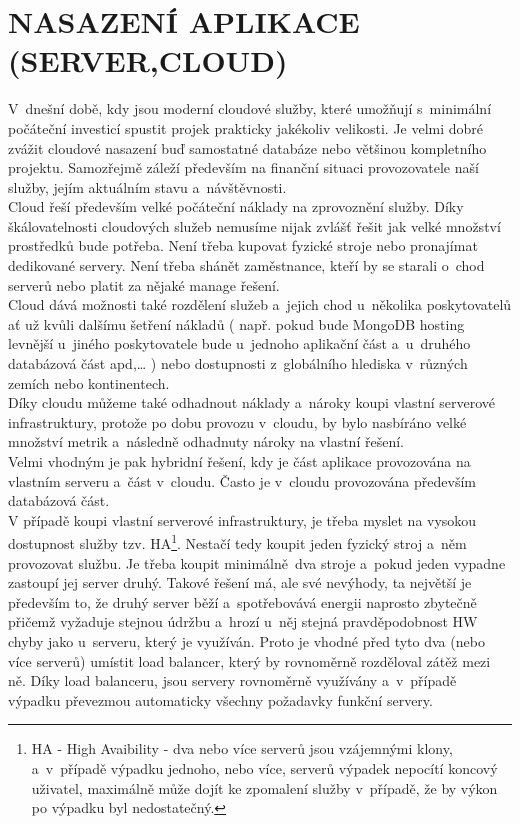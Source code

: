 \documentclass[a4paper,12pt,twoside,BCOR=10mm]{article}
\newcommand{\upc}[1]{\uppercase{#1}} %
\begin{document}
\section{\upc{Nasazení aplikace (server,cloud)}}
V~dnešní době, kdy jsou moderní cloudové služby, které umožňují s~minimální počáteční investicí spustit projek prakticky jakékoliv velikosti. Je velmi dobré zvážit cloudové nasazení buď samostatné databáze nebo většinou kompletního projektu. Samozřejmě záleží především na finanční situaci provozovatele naší služby, jejím aktuálním stavu a~návštěvnosti.\\
Cloud řeší především velké počáteční náklady na zprovoznění služby. Díky škálovatelnosti cloudových služeb nemusíme nijak zvlášť řešit jak velké množství prostředků bude potřeba. Není třeba kupovat fyzické stroje nebo pronajímat dedikované servery. Není třeba shánět zaměstnance, kteří by se starali o~chod serverů nebo platit za nějaké manage řešení.\\
Cloud dává možnosti také rozdělení služeb a~jejich chod u~několika poskytovatelů ať už kvůli dalšímu šetření nákladů ( např. pokud bude MongoDB hosting levnější u~jiného poskytovatele bude u~jednoho aplikační část a~u~druhého databázová část apd,… ) nebo dostupnosti z~globálního hlediska v~různých zemích nebo kontinentech.\\
Díky cloudu můžeme také odhadnout náklady a~nároky koupi vlastní serverové infrastruktury, protože po dobu provozu v~cloudu, by bylo nasbíráno velké množství metrik a~následně odhadnuty nároky na vlastní řešení.\\
Velmi vhodným je pak hybridní řešení, kdy je část aplikace provozována na vlastním serveru a~část v~cloudu. Často je v~cloudu provozována především databázová část. \\
V případě koupi vlastní serverové infrastruktury, je třeba myslet na vysokou dostupnost služby tzv. HA\footnote{HA - High Avaibility - dva nebo více serverů jsou vzájemnými klony, a~v~případě výpadku jednoho, nebo více, serverů výpadek nepocítí koncový uživatel, maximálně může dojít ke zpomalení služby v~případě, že by výkon po výpadku byl nedostatečný.}. Nestačí tedy koupit jeden fyzický stroj a~něm provozovat službu. Je třeba koupit minimálně dva stroje a~pokud jeden vypadne zastoupí jej server druhý. Takové řešení má, ale své nevýhody, ta největší je především to, že druhý server běží a~spotřebovává energii naprosto zbytečně přičemž vyžaduje stejnou údržbu a~hrozí u~něj stejná pravděpodobnost HW chyby jako u~serveru, který je využíván. Proto je vhodné před tyto dva (nebo více serverů) umístit load balancer, který by rovnoměrně rozděloval zátěž mezi ně. Díky load balanceru, jsou servery rovnoměrně využívány a~v~případě výpadku převezmou automaticky všechny požadavky funkční servery.\\
\end{document}
